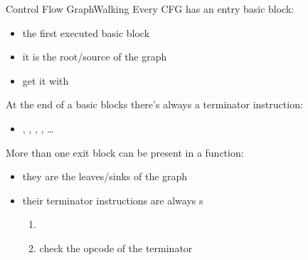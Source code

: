 \begin{frame}{Control Flow Graph}{Walking}
Every CFG has an \alert{entry} basic block:

\begin{itemize}
\item the \alert{first} executed basic block
\item it is the \alert{root/source} of the graph
\item get it with 
\end{itemize}

\vfill
At the end of a basic blocks there's always a \alert{terminator} instruction:
\begin{itemize}
\item {}, , , , \ldots
\end{itemize}

\vfill
More than one \alert{exit} block can be present in a function:

\begin{itemize}
\item they are the \alert{leaves/sinks} of the graph
\item their terminator instructions are always s
\begin{enumerate}
\item {}
\item check the opcode of the terminator
\end{enumerate}
\end{itemize}
\end{frame}


